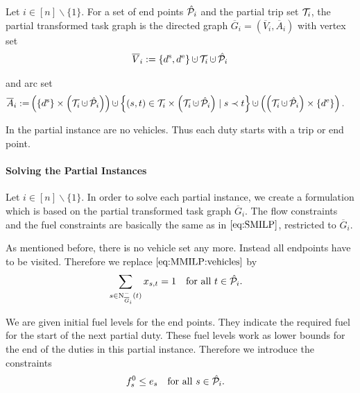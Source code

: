\begin{definition}

Let ${i\in[n]\backslash\{1\}}$. For a set of end points $\hat{\mathcal{P}}_i$ and the partial trip set $\mathcal{T}_i$, the partial transformed task graph is the directed graph ${\overline{G}_i=\left(\overline{V}_i,\overline{A}_i\right)}$ with vertex set
\begin{align*}
	\overline{V}_i := \left\{\ds,\de\right\}\cupdot\Ti\cupdot\Phat_i
\end{align*}

and arc set
\begin{align*}
	\overline{A}_i := & \left(\left\{\ds\right\}\times\left(\Ti\cupdot\Phat_i\right)\right)\cupdot\left\{(s,t)\in\Ti\times\left(\Ti\cupdot\Phat_i\right)\mid s\prec t\right\} \cupdot\left(\left(\Ti\cupdot\Phat_i\right)\times\left\{\de\right\}\right).
\end{align*}

\end{definition}

In the partial instance are no vehicles. Thus each duty starts with a trip or end point.

\paragraph{Solving the Partial Instances} \parfill

Let ${i\in[n]\backslash\{1\}}$. In order to solve each partial instance, we create a formulation which is based on the partial transformed task graph $\overline{G}_i$. The flow constraints and the fuel constraints are basically the same as in $\eqref{eq:SMILP}$, restricted to $\overline{G}_i$. 

As mentioned before, there is no vehicle set any more. Instead all endpoints have to be visited. Therefore we replace $\eqref{eq:MMILP:vehicles}$ by
\begin{align}
	& \sum_{s\in\operatorname{N}_{\overline{G}_i}^-(t)} x_{s,t} = 1 && \text{for all } t\in\hat{\mathcal{P}}_i. \label{eq:CMILP:start_end_points}
\end{align}

We are given initial fuel levels for the end points. They indicate the required fuel for the start of the next partial duty. These fuel levels work as lower bounds for the end of the duties in this partial instance. Therefore we introduce the constraints
\begin{align}
	& f^0_s \leq e_s && \text{for all } s\in\hat{\mathcal{P}}_i.\label{eq:CMILP:final_fuel}
\end{align}

